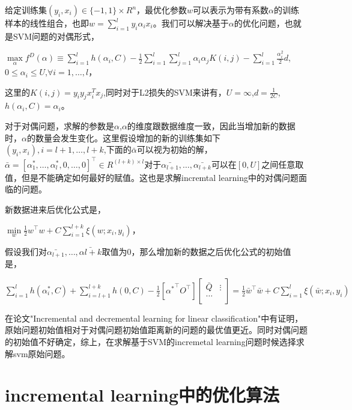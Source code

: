 \documentclass[master]{njuthesis}
\begin{document}
    给定训练集$\left(y_i,x_i\right) \in \{-1,1\} \times R^n$，最优化参数$w$可以表示为带有系数$\alpha$的训练样本的线性组合，也即$w=\sum_{i=1}^l y_i\alpha_ix_i$。我们可以解决基于$\alpha$的优化问题，也就是SVM问题的对偶形式，

    $\max\limits_{\alpha} f^D\left(\alpha\right) \equiv \sum_{i=1}^l h\left(\alpha_i,C\right)-\frac{1}{2}\sum_{i=1}^l \sum_{j=1}^l \alpha_i\alpha_j K\left(i,j\right)-\sum_{i=1}^l \frac{\alpha_i^2}{2}d$,$0 \le \alpha_i \le U$,$\forall i=1,\dots,l$，

    这里的$K\left(i,j\right)=y_iy_jx^T_ix_j$,同时对于L2损失的SVM来讲有，$U=\infty$,$d=\frac{1}{2C}$,$h\left(\alpha_i,C\right)=\alpha_i$。
    
    对于对偶问题，求解的参数是$\alpha$,$\alpha$的维度跟数据维度一致，因此当增加新的数据时，$\alpha$的数量会发生变化。这里假设增加的新的训练集如下$(y_i,x_i),i = l+1,\dots,l+k$,下面的$\bar{\alpha}$可以视为初始的解，$\bar{\alpha} = [\alpha^\ast_1,\dots,\alpha^\ast_l,0,\dots,0]^\intercal \in R^{\left(l+k\right) \times l}$对于$\bar{\alpha_{l+1}},\dots,\bar{\alpha_{l+k}}$可以在$[0,U]$之间任意取值，但是不能确定如何最好的赋值。这也是求解incremtal learning中的对偶问题面临的问题。

    新数据进来后优化公式是，
    
    $\min\limits_{w} \frac{1}{2}w^\intercal w+C\sum_{i=1}^{l+k} \xi\left(w;x_i,y_i\right)$，

    假设我们对$\bar{\alpha_{l+1}},\dots,\bar{\alpha{l+k}}$取值为0，那么增加新的数据之后优化公式的初始值是，
    
    $\sum_{i=1}^l h\left(\alpha^\ast_i,C\right)+\sum_{i=l+1}^{l+k} h\left(0,C\right)-\frac{1}{2}[{\alpha^\ast}^\intercal O^\intercal]\left[{\begin{array}{ccccc} \bar{Q} & \vdots \\ \dots & \\ \end{array}}\right] = \frac{1}{2}\bar{w}^\intercal \bar{w}+C\sum_{i=1}^l \xi\left(\bar{w};x_i,y_i\right)$
    
    在论文"Incremental and decremental learning for linear classification"中有证明，原始问题初始值相对于对偶问题初始值距离新的问题的最优值更近。同时对偶问题的初始值不好确定，综上，在求解基于SVM的incremetal learning问题时候选择求解svm原始问题。

\section{incremental learning中的优化算法}
\end{document}
